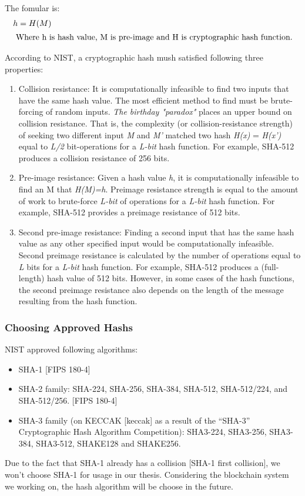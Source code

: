 The fomular is:
\begin{align*}
  h & = H(M) \\ \intertext{ Where h is hash value, M is pre-image and H is cryptographic hash function.}
\end{align*}


According to NIST, a cryptographic hash mush satisfied following three properties:
\begin{enumerate}
  \item Collision resistance: It is computationally infeasible to find two inputs that have the same hash value.
        The most efficient method to find must be brute-forcing of random inputs.
        \emph{The birthday "paradox"} places an upper bound on collision resistance.
        That is, the complexity (or collision-resistance strength) of seeking two different input \emph{M} and \emph{M'} matched two hash \emph{H(x)} = \emph{H(x’)} equal to \emph{L/2} bit-operations for a \emph{L-bit} hash function.
        For example, SHA-512 produces a collision resistance of 256 bits.

  \item Pre-image resistance: Given a hash value \emph{h}, it is computationally infeasible to find an M that \emph{H(M)=h}.
        Preimage resistance strength is equal to the amount of work to brute-force \emph{L-bit} of operations for a \emph{L-bit} hash function.
        For example, SHA-512 provides a preimage resistance of 512 bits.

  \item Second pre-image resistance: Finding a second input that has the same hash value as any other specified input would be computationally infeasible.
        Second preimage resistance is calculated by the number of operations equal to  \emph{L} bits for a \emph{L-bit} hash function.
        For example, SHA-512 produces a (full-length) hash value of 512 bits.
        However, in some cases of the hash functions, the second preimage resistance also depends on the length of the message resulting from the hash function.

\end{enumerate}

\subsubsection{Choosing Approved Hashs}
NIST approved following algorithms:
\begin{itemize}
  \item SHA-1 [FIPS 180-4]

  \item SHA-2 family: SHA-224, SHA-256, SHA-384, SHA-512, SHA-512/224, and SHA-512/256. [FIPS 180-4]

  \item SHA-3 family (on KECCAK [keccak] as a result of the “SHA-3” Cryptographic Hash Algorithm Competition):  SHA3-224, SHA3-256, SHA3-384, SHA3-512, SHAKE128 and SHAKE256.
\end{itemize}
Due to the fact that SHA-1 already has a collision [SHA-1 first collision], we won't choose SHA-1 for usage in our thesis.
Considering the blockchain system we working on, the hash algorithm will be choose in the future.


